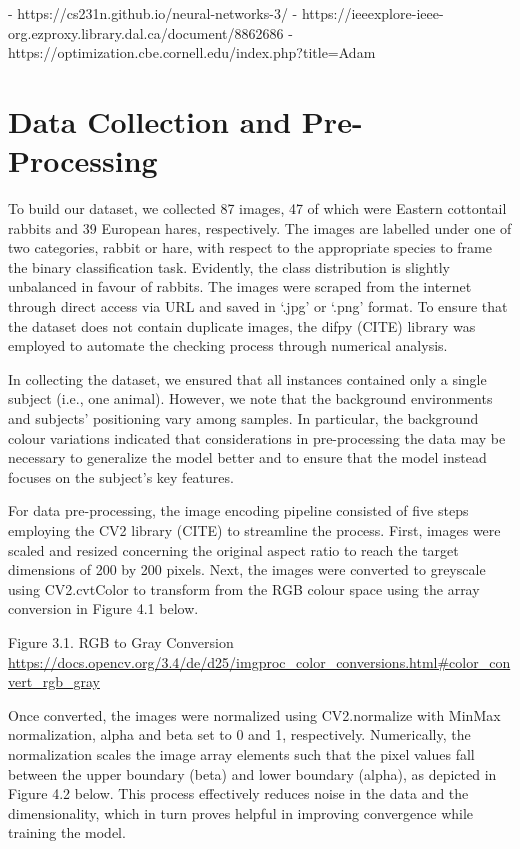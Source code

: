 \documentclass{article}
\begin{document}
-	https://cs231n.github.io/neural-networks-3/ 
-	https://ieeexplore-ieee-org.ezproxy.library.dal.ca/document/8862686
-	https://optimization.cbe.cornell.edu/index.php?title=Adam 


\section{Data Collection and Pre-Processing}
To build our dataset, we collected 87 images, 47 of which were Eastern cottontail rabbits and 39 European hares, respectively. The images are labelled under one of two categories, rabbit or hare, with respect to the appropriate species to frame the binary classification task. Evidently, the class distribution is slightly unbalanced in favour of rabbits. The images were scraped from the internet through direct access via URL and saved in ‘.jpg’ or ‘.png’ format. To ensure that the dataset does not contain duplicate images, the difpy (CITE) library was employed to automate the checking process through numerical analysis. 

In collecting the dataset, we ensured that all instances contained only a single subject (i.e., one animal). However, we note that the background environments and subjects’ positioning vary among samples. In particular, the background colour variations indicated that considerations in pre-processing the data may be necessary to generalize the model better and to ensure that the model instead focuses on the subject’s key features. 

For data pre-processing, the image encoding pipeline consisted of five steps employing the CV2 library (CITE) to streamline the process. First, images were scaled and resized concerning the original aspect ratio to reach the target dimensions of 200 by 200 pixels. Next, the images were converted to greyscale using CV2.cvtColor to transform from the RGB colour space using the array conversion in Figure 4.1 below. 


Figure 3.1. RGB to Gray Conversion \url{https://docs.opencv.org/3.4/de/d25/imgproc_color_conversions.html#color_convert_rgb_gray}

Once converted, the images were normalized using CV2.normalize with MinMax normalization, alpha and beta set to 0 and 1, respectively. Numerically, the normalization scales the image array elements such that the pixel values fall between the upper boundary (beta) and lower boundary (alpha), as depicted in Figure 4.2 below. This process effectively reduces noise in the data and the dimensionality, which in turn proves helpful in improving convergence while training the model.
\end{document}
